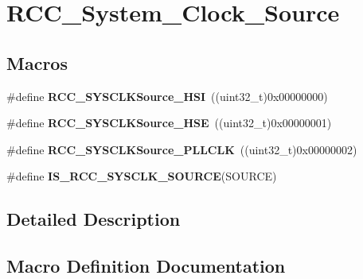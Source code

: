 \hypertarget{group___r_c_c___system___clock___source}{}\section{R\+C\+C\+\_\+\+System\+\_\+\+Clock\+\_\+\+Source}
\label{group___r_c_c___system___clock___source}
\subsection*{Macros}
\begin{DoxyCompactItemize}
\item 
\hypertarget{group___r_c_c___system___clock___source_ga0f392254e74dd965c48edd5aad148e20}{}\#define {\bfseries R\+C\+C\+\_\+\+S\+Y\+S\+C\+L\+K\+Source\+\_\+\+H\+S\+I}~((uint32\+\_\+t)0x00000000)\label{group___r_c_c___system___clock___source_ga0f392254e74dd965c48edd5aad148e20}

\item 
\hypertarget{group___r_c_c___system___clock___source_gabeae110e41833842f8620647ea0ce85a}{}\#define {\bfseries R\+C\+C\+\_\+\+S\+Y\+S\+C\+L\+K\+Source\+\_\+\+H\+S\+E}~((uint32\+\_\+t)0x00000001)\label{group___r_c_c___system___clock___source_gabeae110e41833842f8620647ea0ce85a}

\item 
\hypertarget{group___r_c_c___system___clock___source_ga9301b7a07a7cb8c2c6ed87b619c1c966}{}\#define {\bfseries R\+C\+C\+\_\+\+S\+Y\+S\+C\+L\+K\+Source\+\_\+\+P\+L\+L\+C\+L\+K}~((uint32\+\_\+t)0x00000002)\label{group___r_c_c___system___clock___source_ga9301b7a07a7cb8c2c6ed87b619c1c966}

\item 
\#define {\bfseries I\+S\+\_\+\+R\+C\+C\+\_\+\+S\+Y\+S\+C\+L\+K\+\_\+\+S\+O\+U\+R\+C\+E}(S\+O\+U\+R\+C\+E)
\end{DoxyCompactItemize}


\subsection{Detailed Description}


\subsection{Macro Definition Documentation}
\hypertarget{group___r_c_c___system___clock___source_gaae9d6172a72b0a90cb3703aa59258c57}{}
